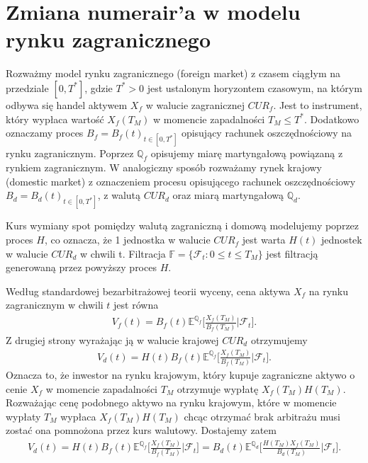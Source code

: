 \documentclass{mini}
\theoremstyle{mythstyle}
\begin{document}
\section{Zmiana numerair'a w modelu rynku zagranicznego}

Rozważmy model rynku zagranicznego (foreign market) z czasem ciągłym na przedziale $[0, T^*]$, gdzie $T^* >  0$ jest ustalonym horyzontem czasowym, na którym odbywa się handel aktywem  $X_f$ w walucie zagranicznej $CUR_f$. Jest to instrument, który wypłaca wartość $X_f(T_M)$ w momencie zapadalności $T_M \le T^* $. Dodatkowo oznaczamy proces $B_f = B_f(t)_{t \in [0,T^*]}$ opisujący rachunek oszczędnościowy na rynku zagranicznym. Poprzez $\mathbb{Q}_f$ opisujemy miarę martyngałową powiązaną z rynkiem zagranicznym. W analogiczny sposób rozważamy rynek krajowy (domestic market) z oznaczeniem procesu opisującego rachunek oszczędnościowy $B_d = B_d(t)_{t \in [0,T^*]}$, z walutą $CUR_d$ oraz miarą martyngałową $\mathbb{Q}_d$. 

Kurs wymiany spot pomiędzy walutą zagraniczną i domową modelujemy poprzez proces 
$H$, co oznacza, że 1 jednostka w walucie $CUR_f$ jest warta $H(t)$ jednostek w walucie $CUR_d$ w chwili t. Filtracja $\mathbb{F} = \{\mathcal{F}_t: 0 \le t \le T_M\}$ jest filtracją generowaną przez powyższy proces $H$.

Według standardowej bezarbitrażowej teorii wyceny, cena aktywa  $X_f$ na rynku zagranicznym w chwili $t$ jest równa
\begin{eqnarray}
	V_f(t) = B_f(t) \mathbb{E}^{\mathbb{Q}_f}\bigg[\frac{X_f(T_M)}{B_f(T_M)}\bigg|\mathcal{F}_t\bigg].
\end{eqnarray}
Z drugiej strony wyrażając ją w walucie krajowej $CUR_d$ otrzymujemy
\begin{eqnarray}
	V_d(t) = H(t) B_f(t) \mathbb{E}^{\mathbb{Q}_f}\bigg[\frac{X_f(T_M)}{B_f(T_M)}\bigg|\mathcal{F}_t\bigg].
\end{eqnarray}
Oznacza to, że inwestor na rynku krajowym, który kupuje zagraniczne aktywo o cenie $X_f$ w momencie zapadalności $T_M$ otrzymuje wypłatę $X_f(T_M) H(T_M)$. Rozważając cenę podobnego aktywo na rynku krajowym, które w momencie wypłaty $T_M$ wypłaca $X_f(T_M) H(T_M)$ chcąc otrzymać brak arbitrażu musi zostać ona pomnożona przez kurs walutowy. Dostajemy zatem
\begin{eqnarray}
	V_d(t) = H(t) B_f(t) \mathbb{E}^{\mathbb{Q}_f}\bigg[\frac{X_f(T_M)}{B_f(T_M)}\bigg|\mathcal{F}_t\bigg] = B_d(t) \mathbb{E}^{\mathbb{Q}_d} \bigg[ \frac{H(T_M)X_f(T_M)}{B_d(T_M)} \bigg| \mathcal{F}_t\bigg].
\end{eqnarray}
\end{document}
